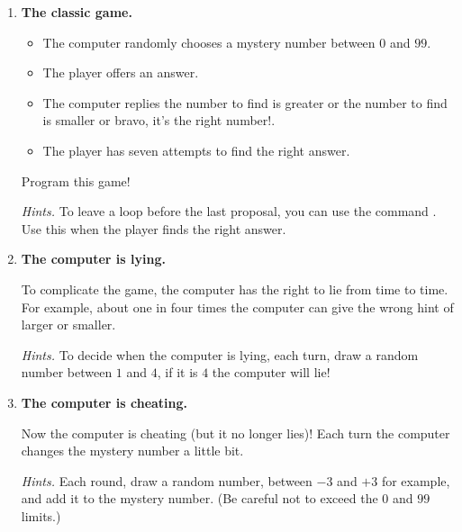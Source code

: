 \documentclass[11pt,class=report,crop=false]{standalone}
\begin{document}
\bigskip
\bigskip


\begin{activite}



\begin{enumerate}
  \item \textbf{The classic game.}
  \begin{itemize}
    \item The computer randomly chooses a mystery number between $0$ and $99$.
    \item The player offers an answer.
    \item The computer replies 
    \og{}the number to find is greater\fg{} or
     \og{}the number to find is smaller\fg{} or
      \og{}bravo, it's the right number!\fg{}. 
     \item The player has seven attempts to find the right answer.
  \end{itemize}
  
  Program this game!
  
  \emph{Hints.} To leave a  loop before the last proposal, you can use the command . Use this when the player finds the right answer.

  
  \item \textbf{The computer is lying.}
  
  To complicate the game, the computer has the right to lie from time to time.
  For example, about one in four times the computer can give the wrong hint of \og{}larger\fg{} or \og{}smaller\fg{}.
  
  \emph{Hints.} To decide when the computer is lying, each turn, draw a random number between $1$ and $4$, if it is $4$ the computer will lie!
  
  
  
  
  \item \textbf{The computer is cheating.}
  
  Now the computer is cheating (but it no longer lies)! Each turn the computer changes the mystery number a little bit.
  
    \emph{Hints.} Each round, draw a random number, between $-3$ and $+3$ for example, and add it to the mystery number. (Be careful not to exceed the $0$ and $99$ limits.)
  
\end{enumerate}   
     
\end{activite}
\end{document}
